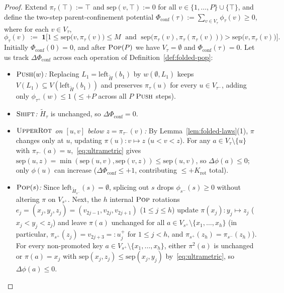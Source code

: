 \documentclass[11pt]{article}
\theoremstyle{definition}
\theoremstyle{remark}
\newcommand{\sep}{\mathrm{sep}}
\newcommand{\PUSH}{\textnormal{\scshape Push}}
\newcommand{\POP}{\textnormal{\scshape Pop}}
\newcommand{\SHIFT}{\textnormal{\scshape Shift}}
\newcommand{\UPROT}{\textnormal{\scshape UpperRot}}
\begin{document}
\begin{proof}
Extend $\pi_\tau(\top) := \top$ and $\sep(v, \top) := 0$ for all $v \in \{1, \dots, P\} \cup \{\top\}$, and define the two-step parent-confinement potential $\Phi_{\mathrm{conf}}(\tau) := \sum_{v \in V_\tau} \phi_\tau(v) \ge 0$, where for each $v \in V_\tau$,
\[
\phi_\tau(v) \;:=\; \mathbf{1}\Big[1 \le \sep\big(v, \pi_\tau(v)\big) \le M \;\text{ and }\; \sep\big(\pi_\tau(v), \pi_\tau(\pi_\tau(v))\big) > \sep\big(v, \pi_\tau(v)\big)\Big].
\]
Initially $\Phi_{\mathrm{conf}}(0) = 0$, and after $\POP(P)$ we have $V_\tau = \emptyset$ and $\Phi_{\mathrm{conf}}(\tau) = 0$. Let us track $\Delta\Phi_{\mathrm{conf}}$ across each operation of Definition~\ref{def:folded-pop}:
\begin{itemize}[leftmargin=2em]
  \item \emph{$\PUSH(w)$:} Replacing $L_1 = \mathrm{left}_{\widetilde{H}}(b_1)$ by $w(\emptyset, L_1)$ keeps $V(L_1) \subseteq V(\mathrm{left}_{\widetilde{H}}(b_1))$ and preserves $\pi_\tau(u)$ for every $u \in V_{\tau^-}$, adding only $\phi_{\tau^+}(w) \le 1$ ($\le +P$ across all $P$ $\PUSH$ steps).
  \item \emph{$\SHIFT$:} $\widetilde{H}_\tau$ is unchanged, so $\Delta\Phi_{\mathrm{conf}} = 0$.
  \item \emph{$\UPROT$ on $[u, v]$ below $z = \pi_{\tau^-}(v)$:} By Lemma~\ref{lem:folded-laws}(1), $\pi$ changes only at $u$, updating $\pi(u) : v \mapsto z$ ($u < v < z$). For any $a \in V_\tau \setminus \{u\}$ with $\pi_{\tau^-}(a) = u$,~\eqref{eq:ultrametric} gives $\sep(u, z) = \min(\sep(u, v), \sep(v, z)) \le \sep(u, v)$, so $\Delta\phi(a) \le 0$; only $\phi(u)$ can increase ($\Delta\Phi_{\mathrm{conf}} \le +1$, contributing $\le +K_{\mathrm{rot}}$ total).
  \item \emph{$\POP(s)$:} Since $\mathrm{left}_{\widetilde{H}_{s^-}}(s) = \emptyset$, splicing out $s$ drops $\phi_{s^-}(s) \ge 0$ without altering $\pi$ on $V_{s^+}$. Next, the $h$ internal $\POP$ rotations $e_j = (x_j, y_j, z_j) = (v_{2j-1}, v_{2j}, v_{2j+1})$ ($1 \le j \le h$) update $\pi(x_j) : y_j \mapsto z_j$ ($x_j < y_j < z_j$) and leave $\pi(a)$ unchanged for all $a \in V_{s^+} \setminus \{x_1, \dots, x_h\}$ (in particular, $\pi_{s^+}(z_j) = v_{2j+3} =: u_j^+$ for $1 \le j < h$, and $\pi_{s^+}(z_h) = \pi_{s^-}(z_h)$). For every non-promoted key $a \in V_{s^+} \setminus \{x_1, \dots, x_h\}$, either $\pi^2(a)$ is unchanged or $\pi(a) = x_j$ with $\sep(x_j, z_j) \le \sep(x_j, y_j)$ by~\eqref{eq:ultrametric}, so $\Delta\phi(a) \le 0$.
\end{itemize}


\end{proof}
\end{document}
